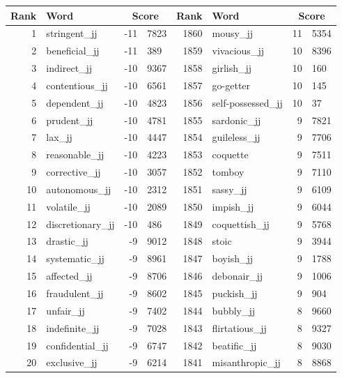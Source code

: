 \begin{table}[tbp]
    \begin{tabular}{| rlr@{.}l | rlr@{.}l |}
    \hline
    \textbf{Rank} & \textbf{Word} & \multicolumn{2}{c|}{\textbf{Score}} & \textbf{Rank} & \textbf{Word} & \multicolumn{2}{c|}{\textbf{Score}} \\
    \hline
    1 & stringent\_jj & -11 & 7823    &    1860 & mousy\_jj & 11 & 5354 \\
    2 & beneficial\_jj & -11 & 389    &    1859 & vivacious\_jj & 10 & 8396 \\
    3 & indirect\_jj & -10 & 9367    &    1858 & girlish\_jj & 10 & 160 \\
    4 & contentious\_jj & -10 & 6561    &    1857 & go-getter & 10 & 145 \\
    5 & dependent\_jj & -10 & 4823    &    1856 & self-possessed\_jj & 10 & 37 \\
    6 & prudent\_jj & -10 & 4781    &    1855 & sardonic\_jj & 9 & 7821 \\
    7 & lax\_jj & -10 & 4447    &    1854 & guileless\_jj & 9 & 7706 \\
    8 & reasonable\_jj & -10 & 4223    &    1853 & coquette & 9 & 7511 \\
    9 & corrective\_jj & -10 & 3057    &    1852 & tomboy & 9 & 7110 \\
    10 & autonomous\_jj & -10 & 2312    &    1851 & sassy\_jj & 9 & 6109 \\
    11 & volatile\_jj & -10 & 2089    &    1850 & impish\_jj & 9 & 6044 \\
    12 & discretionary\_jj & -10 & 486    &    1849 & coquettish\_jj & 9 & 5768 \\
    13 & drastic\_jj & -9 & 9012    &    1848 & stoic & 9 & 3944 \\
    14 & systematic\_jj & -9 & 8961    &    1847 & boyish\_jj & 9 & 1788 \\
    15 & affected\_jj & -9 & 8706    &    1846 & debonair\_jj & 9 & 1006 \\
    16 & fraudulent\_jj & -9 & 8602    &    1845 & puckish\_jj & 9 & 904 \\
    17 & unfair\_jj & -9 & 7402    &    1844 & bubbly\_jj & 8 & 9660 \\
    18 & indefinite\_jj & -9 & 7028    &    1843 & flirtatious\_jj & 8 & 9327 \\
    19 & confidential\_jj & -9 & 6747    &    1842 & beatific\_jj & 8 & 9030 \\
    20 & exclusive\_jj & -9 & 6214    &    1841 & misanthropic\_jj & 8 & 8868 \\

\end{tabular}
\end{table}
